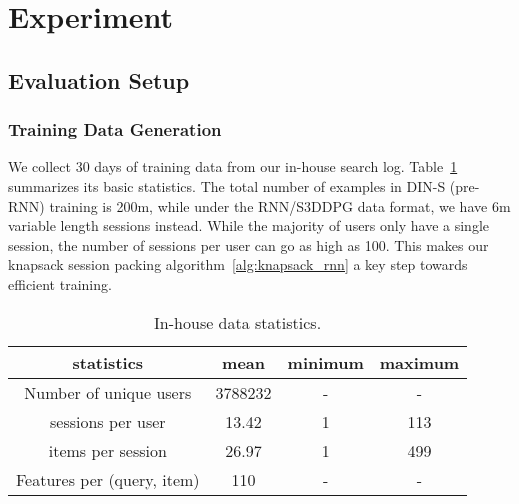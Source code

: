 \section{Experiment}
\label{sec:experiment}
\subsection{Evaluation Setup}



\subsubsection{Training Data Generation}
We collect 30 days of training data from our in-house search log. Table~\ref{tab:in-house-data} summarizes its basic statistics. The total number of examples in DIN-S (pre-RNN) training is 200m, while under the RNN/S3DDPG data format, we have 6m variable length sessions instead. While the majority of users only have a single session, the number of sessions per user can go as high as 100. This makes our knapsack session packing algorithm~\ref{alg:knapsack_rnn} a key step towards efficient training. 
\begin{table}[htbp]
\centering
\caption{In-house data statistics.}
\small
\begin{tabular}{c|c|c|c}
\hline
statistics & mean & minimum & maximum \\
\hline
Number of unique users & 3788232 & - & - \\
\hline
sessions per user &	13.42 & 1 & 113 \\
\hline
items per session & 26.97 & 1 & 499 \\
\hline
Features per (query, item) & 110 & - & - \\
\hline
\end{tabular}
\label{tab:in-house-data}
\end{table}

